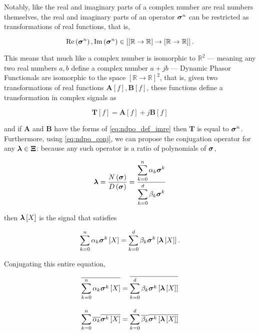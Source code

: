 	Notably, like the real and imaginary parts of a complex number are real numbers themselves, the real and imaginary parts of an operator $\boldsymbol{\sigma}^{n}$ can be restricted as transformations of real functions, that is,

\begin{equation} \operatorname{Re}\left(\boldsymbol{\sigma}^{n}\right),\operatorname{Im}\left(\boldsymbol{\sigma}^{n}\right)\in\left[\left[\mathbb{R}\to\mathbb{R}\right]\to\left[\mathbb{R}\to\mathbb{R}\right]\right] . \end{equation}

	This means that much like a complex number is isomorphic to $\mathbb{R}^2$ — meaning any two real numbers $a,b$ define a complex number $a + jb$ — Dynamic Phasor Functionals are isomorphic to the space $\left[\mathbb{R}\to\mathbb{R}\right]^2$, that is, given two transformations of real functions $\mathbf{A}\left[f\right], \mathbf{B}\left[f\right]$, these functions define a transformation in complex signals as

\begin{equation} \mathbf{T}\left[f\right] = \mathbf{A}\left[f\right] + j\mathbf{B}\left[f\right] \end{equation}

	\noindent and if $\mathbf{A}$ and $\mathbf{B}$ have the forms of \eqref{eq:ndpo_def_imre} then $\mathbf{T}$ is equal to $\boldsymbol{\sigma}^{n}$. Furthermore, using \eqref{eq:ndpo_conj}, we can propose the conjugation operator for any $\boldsymbol{\lambda}\in\boldsymbol{\Xi}$: because any such operator is a ratio of polynomials of $\boldsymbol{\sigma}$,

\begin{equation} \boldsymbol{\lambda} = \dfrac{N\left(\boldsymbol{\sigma}\right)}{D\left(\boldsymbol{\sigma}\right)} = \dfrac{\displaystyle \sum_{k=0}^n \alpha_k \boldsymbol{\sigma}^{k}}{\displaystyle\sum_{k=0}^d \beta_k \boldsymbol{\sigma}^{k}} \end{equation}

	\noindent then $\boldsymbol{\lambda}\left[X\right]$ is the signal that satisfies

\begin{equation} \sum_{k=0}^n \alpha_k \boldsymbol{\sigma}^{k}\left[X\right] = \sum_{k=0}^d \beta_k \boldsymbol{\sigma}^{k}\left[\boldsymbol{\lambda}\left[X\right]\right] .\end{equation}

	Conjugating this entire equation,

\begin{gather}
	\overline{\sum_{k=0}^n \alpha_k \boldsymbol{\sigma}^{k}\left[X\right]} = \overline{ \sum_{k=0}^d \beta_k \boldsymbol{\sigma}^{k}\left[\boldsymbol{\lambda}\left[X\right]\right]}  \nonumber\\[3mm]
	\sum_{k=0}^n \overline{\alpha_k} \overline{\boldsymbol{\sigma}^{k}\left[X\right]} = \sum_{k=0}^d \overline{\beta_k} \overline{\boldsymbol{\sigma}^{k}\left[\boldsymbol{\lambda}\left[X\right]\right]} 
\end{gather}

